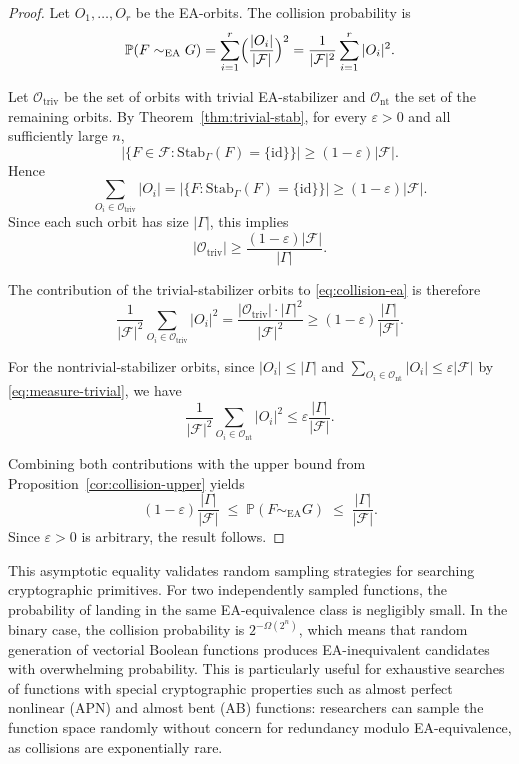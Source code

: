 \documentclass[11pt]{article}
\theoremstyle{definition}
\newcommand{\Fcal}{\mathcal{F}}
\newcommand{\Gam}{\Gamma}
\newcommand{\id}{\mathrm{id}}
\newcommand{\Stab}{\mathrm{Stab}}
\renewcommand{\Pr}{\mathbb{P}}
\begin{document}
\begin{proof}
Let $O_1,\dots,O_r$ be the EA-orbits. The collision probability is
\begin{equation}\label{eq:collision-ea}
\Pr(F\sim_{\mathrm{EA}} G)
= \sum_{i=1}^r \Bigl( \frac{|O_i|}{|\Fcal|} \Bigr)^2
= \frac{1}{|\Fcal|^2}\sum_{i=1}^r |O_i|^2.
\end{equation}

Let $\mathcal O_{\mathrm{triv}}$ be the set of orbits with trivial EA-stabilizer
and $\mathcal O_{\mathrm{nt}}$ the set of the remaining orbits.
By Theorem~\ref{thm:trivial-stab}, for every $\varepsilon>0$ and all sufficiently large $n$,
\begin{equation}\label{eq:measure-trivial}
|\{F\in\Fcal: \Stab_\Gam(F)=\{\id\}\}|
\ge (1-\varepsilon)|\Fcal|.
\end{equation}
Hence
\[
\sum_{O_i\in \mathcal O_{\mathrm{triv}}} |O_i|
= |\{F:\Stab_\Gam(F)=\{\id\}\}|
\ge (1-\varepsilon)|\Fcal|.
\]
Since each such orbit has size $|\Gam|$, this implies
\[
|\mathcal O_{\mathrm{triv}}|
\ge \frac{(1-\varepsilon)|\Fcal|}{|\Gam|}.
\]

The contribution of the trivial-stabilizer orbits to \eqref{eq:collision-ea} is therefore
\[
\frac{1}{|\Fcal|^2}
\sum_{O_i\in\mathcal O_{\mathrm{triv}}} |O_i|^2
=
\frac{|\mathcal O_{\mathrm{triv}}|\cdot |\Gam|^2}{|\Fcal|^2}
\ge (1-\varepsilon)\frac{|\Gam|}{|\Fcal|}.
\]

For the nontrivial-stabilizer orbits, since
$|O_i|\le |\Gam|$ and
$\sum_{O_i\in\mathcal O_{\mathrm{nt}}} |O_i| \le \varepsilon |\Fcal|$
by \eqref{eq:measure-trivial}, we have
\[
\frac{1}{|\Fcal|^2}\sum_{O_i\in\mathcal O_{\mathrm{nt}}} |O_i|^2
\le
\varepsilon\frac{|\Gam|}{|\Fcal|}.
\]

Combining both contributions with the upper bound from Proposition~\ref{cor:collision-upper} yields
\[
(1-\varepsilon)\frac{|\Gam|}{|\Fcal|}
\;\le\;
\Pr(F\sim_{\mathrm{EA}} G)
\;\le\;
\frac{|\Gam|}{|\Fcal|}.
\]
Since $\varepsilon>0$ is arbitrary, the result follows.
\end{proof}

This asymptotic equality validates random sampling strategies for
searching cryptographic primitives. For two independently sampled functions,
the probability of landing in the same EA-equivalence class is negligibly
small. In the binary case, the collision probability is $2^{-\Omega(2^n)}$,
which means that random generation of vectorial Boolean functions produces
EA-inequivalent candidates with overwhelming probability. This is particularly
useful for exhaustive searches of functions with special cryptographic
properties such as almost perfect nonlinear (APN) and almost bent (AB)
functions: researchers can sample the function space randomly without concern
for redundancy modulo EA-equivalence, as collisions are exponentially rare.
\end{document}
